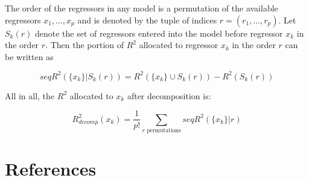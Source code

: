 \documentclass[a4paper,12pt,twoside,onecolumn,openright,final,oldfontcommands]{memoir}
\begin{document}
The order of the regressors in any model is a permutation of the
available regressors \(x_1, ..., x_p\) and is denoted by the tuple of
indices \(r = (r_1, ..., r_p)\). Let \(S_k(r)\) denote the set of
regressors entered into the model before regressor \(x_k\) in the order
\(r\). Then the portion of \(R^2\) allocated to regressor \(x_k\) in the
order \(r\) can be written as

\[seqR^2(\{x_k\}|S_k(r))=R^2(\{x_k\}\cup S_k(r))-R^2(S_k(r))\]

All in all, the \(R^2\) allocated to \(x_k\) after decomposition is:

\[R^2_{decomp}(x_k)=\dfrac{1}{p!}\sum_{r\text{ permutations}}seqR^2(\{x_k\}|r)\]

\chapter*{References}\label{references}


\setlength{\parindent}{-0.5in} \setlength{\leftskip}{0.5in}
\setlength{\parskip}{8pt}


\end{document}

